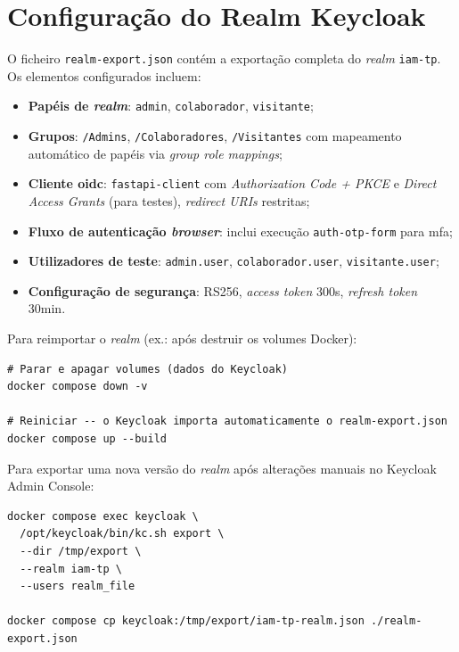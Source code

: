 \chapter{Configuração do Realm Keycloak}
\label{anx:realm}

O ficheiro \texttt{realm-export.json} contém a exportação completa do \textit{realm} \texttt{iam-tp}. Os elementos configurados incluem:

\begin{itemize}
  \item \textbf{Papéis de \textit{realm}}: \texttt{admin}, \texttt{colaborador}, \texttt{visitante};
  \item \textbf{Grupos}: \texttt{/Admins}, \texttt{/Colaboradores}, \texttt{/Visitantes} com mapeamento automático de papéis via \textit{group role mappings};
  \item \textbf{Cliente \gls{oidc}}: \texttt{fastapi-client} com \textit{Authorization Code + PKCE} e \textit{Direct Access Grants} (para testes), \textit{redirect URIs} restritas;
  \item \textbf{Fluxo de autenticação \textit{browser}}: inclui execução \texttt{auth-otp-form} para \gls{mfa};
  \item \textbf{Utilizadores de teste}: \texttt{admin.user}, \texttt{colaborador.user}, \texttt{visitante.user};
  \item \textbf{Configuração de segurança}: RS256, \textit{access token} 300s, \textit{refresh token} 30min.
\end{itemize}

Para reimportar o \textit{realm} (ex.: após destruir os volumes Docker):

\begin{lstlisting}[caption={Reimportação do realm via Docker Compose},label={lst:realm_import}]
# Parar e apagar volumes (dados do Keycloak)
docker compose down -v

# Reiniciar -- o Keycloak importa automaticamente o realm-export.json
docker compose up --build
\end{lstlisting}

Para exportar uma nova versão do \textit{realm} após alterações manuais no Keycloak Admin Console:

\begin{lstlisting}[caption={Exportar realm atualizado},label={lst:realm_export}]
docker compose exec keycloak \
  /opt/keycloak/bin/kc.sh export \
  --dir /tmp/export \
  --realm iam-tp \
  --users realm_file

docker compose cp keycloak:/tmp/export/iam-tp-realm.json ./realm-export.json
\end{lstlisting}
